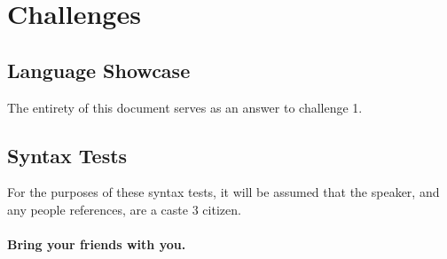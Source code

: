 \chapter{Challenges}


\section{Language Showcase}

The entirety of this document serves as an answer to challenge 1.

\section{Syntax Tests}

For the purposes of these syntax tests, it will be assumed that the speaker, and any people references, are a caste 3 citizen.

\subsubsection{Bring your friends with you.}

